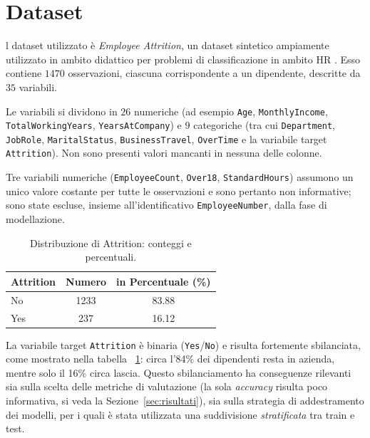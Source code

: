 \documentclass[9pt,a4paper,twocolumn,twoside]{tau-class/tau}
\begin{document}
\section{Dataset}
\label{sec:dataset}

l dataset utilizzato è \textit{Employee Attrition}, un dataset sintetico ampiamente utilizzato in ambito didattico per problemi di classificazione in ambito HR \cite{ibm_hr_attrition}. Esso contiene $1470$ osservazioni, ciascuna corrispondente a un dipendente, descritte da $35$ variabili.

Le variabili si dividono in $26$ numeriche (ad esempio \texttt{Age}, \texttt{MonthlyIncome}, \texttt{TotalWorkingYears}, \texttt{YearsAtCompany}) e $9$ categoriche (tra cui \texttt{Department}, \texttt{JobRole}, \texttt{MaritalStatus}, \texttt{BusinessTravel}, \texttt{OverTime} e la variabile target \texttt{Attrition}). Non sono presenti valori mancanti in nessuna delle colonne.

Tre variabili numeriche (\texttt{EmployeeCount}, \texttt{Over18},
\texttt{StandardHours}) assumono un unico valore costante per tutte le osservazioni e sono pertanto non informative; sono state escluse, insieme all'identificativo \texttt{EmployeeNumber}, dalla fase di modellazione.

\begin{table}[ht]
    \centering
    \begin{tabular}{lcc}
        \toprule
        \textbf{Attrition} & \textbf{Numero} & \textbf{ in Percentuale (\%)} \\
        \midrule
        No  & 1233 & 83.88 \\
        Yes & 237  & 16.12 \\
        \bottomrule
    \end{tabular}
    \caption{Distribuzione di Attrition: conteggi e percentuali.}
    \label{tab:attrition-counts}
\end{table}


La variabile target \texttt{Attrition} è binaria (\texttt{Yes}/\texttt{No}) e risulta fortemente sbilanciata, come mostrato nella tabella ~\ref{tab:attrition-counts}: circa l'84\% dei dipendenti resta in azienda, mentre solo il 16\% circa lascia. Questo sbilanciamento ha conseguenze rilevanti sia sulla scelta delle metriche di valutazione (la sola \emph{accuracy} risulta poco informativa, si veda la Sezione~\ref{sec:risultati}), sia sulla strategia di addestramento dei modelli, per i quali è stata utilizzata una suddivisione \emph{stratificata} tra train e test.
\end{document}
